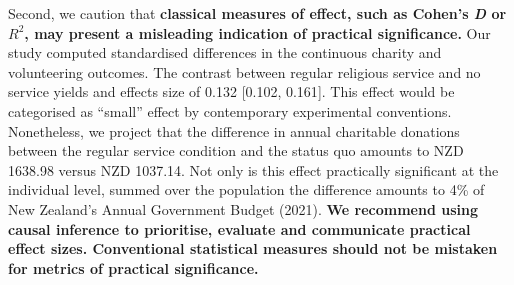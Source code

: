 \documentclass[
  single column]{article}
\begin{document}
Second, we caution that \textbf{classical measures of effect, such as
Cohen's \emph{D} or \(R^2\), may present a misleading indication of
practical significance.} Our study computed standardised differences in
the continuous charity and volunteering outcomes. The contrast between
regular religious service and no service yields and effects size of
0.132 {[}0.102, 0.161{]}. This effect would be categorised as ``small''
effect by contemporary experimental conventions. Nonetheless, we project
that the difference in annual charitable donations between the regular
service condition and the status quo amounts to NZD 1638.98 versus NZD
1037.14. Not only is this effect practically significant at the
individual level, summed over the population the difference amounts to
4\% of New Zealand's Annual Government Budget (2021). \textbf{We
recommend using causal inference to prioritise, evaluate and communicate
practical effect sizes. Conventional statistical measures should not be
mistaken for metrics of practical significance.}
\end{document}
